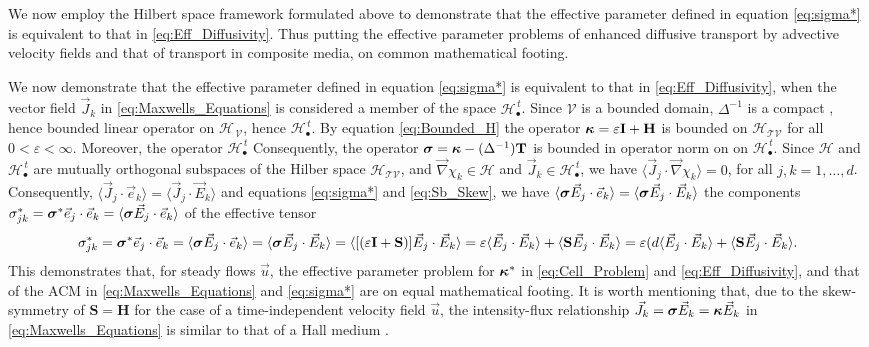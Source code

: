 \documentclass[11pt]{amsart}
\newcommand{\Tb}{\mathbf{T}}
\newcommand{\Hb}{\mathbf{H}}
\newcommand{\Ib}{\mathbf{I}}
\newcommand{\Sb}{\mathbf{S}}
\newcommand{\Tc}{\mathcal{T}}
\newcommand{\Vc}{\mathcal{V}}
\newcommand{\Hs}{\mathscr{H}}
\newcommand\bsig{\mbox{\boldmath${\sigma}$}}
\newcommand\bkappa{\mbox{\boldmath${\kappa}$}}
\begin{document}
We now employ the Hilbert space framework formulated above to
demonstrate that the effective parameter defined in equation
\eqref{eq:sigma*} is equivalent to that in
\eqref{eq:Eff_Diffusivity}. Thus putting the effective parameter
problems of enhanced diffusive transport by advective velocity fields
and that of transport in composite media, on common mathematical
footing.




We now demonstrate that the effective parameter defined in equation
\eqref{eq:sigma*} is equivalent to that in \eqref{eq:Eff_Diffusivity},
when the vector field $\vec{J}_k$ in \eqref{eq:Maxwells_Equations} is
considered a member of the space $\Hs_\bullet^{\,t}$.
Since $\Vc$ is a bounded domain, $\Delta^{-1}$ is
a compact \cite{Stakgold:BVP:2000}, hence bounded linear 
operator on $\Hs_{\,\Vc}$, hence $\Hs_\bullet^{\,t}$. By equation
\eqref{eq:Bounded_H} the operator $\bkappa=\varepsilon\Ib+\Hb$ is bounded on
$\Hs_{\Tc\Vc}$ for all $0<\varepsilon<\infty$. Moreover, the operator  $\Hs_\bullet^{\,t}$
Consequently, the operator $\bsig=\bkappa-(\Delta^{-1})\Tb$ is 
bounded in operator norm on on 
$\Hs_\bullet^{\,t}$. Since $\mathscr{H}$ and $\Hs_\bullet^{\,t}$ are mutually
orthogonal subspaces of the Hilber space $\Hs_{\Tc\Vc}$, and
$\vec{\nabla}\chi_k\in\mathscr{H}$ and $\vec{J}_k\in\Hs_\bullet^{\,t}$, we have
$\langle\vec{J}_j\cdot\vec{\nabla}\chi_k\rangle=0$, for all $j,k=1,\ldots,d$. Consequently,
$\langle\vec{J}_j\cdot\vec{e}_k\rangle=\langle\vec{J}_j\cdot\vec{E}_k\rangle$ and 
equations 
\eqref{eq:sigma*} and \eqref{eq:Sb_Skew}, we have
$\langle\bsig\vec{E}_j\cdot\vec{e}_k\rangle=\langle\bsig\vec{E}_j\cdot\vec{E}_k\rangle$ the components  
$\sigma^*_{jk}=\bsig^*\vec{e}_j\cdot\vec{e}_k=\langle\bsig\vec{E}_j\cdot\vec{e}_k\rangle$ of
the effective tensor 
%
\begin{align}\label{eq:Reduction}
  \sigma^*_{jk}=\bsig^*\vec{e}_j\cdot\vec{e}_k 
       =\langle\bsig\vec{E}_j\cdot\vec{e}_k\rangle
       =\langle\bsig\vec{E}_j\cdot\vec{E}_k\rangle
       =\langle[(\varepsilon\Ib+\Sb)]\vec{E}_j\cdot\vec{E}_k\rangle
       =\varepsilon\langle\vec{E}_j\cdot\vec{E}_k\rangle+\langle\Sb\vec{E}_j\cdot\vec{E}_k\rangle
       =\varepsilon(d\langle\vec{E}_j\cdot\vec{E}_k\rangle+\langle\Sb\vec{E}_j\cdot\vec{E}_k\rangle.
\end{align}
%
This demonstrates that, for steady flows $\vec{u}$, the effective
parameter problem for $\bkappa^*$ in \eqref{eq:Cell_Problem} and
\eqref{eq:Eff_Diffusivity}, and that of the ACM \cite{Golden:CMP-473}
in \eqref{eq:Maxwells_Equations} and \eqref{eq:sigma*}  are on equal
mathematical footing. It is worth  
mentioning that, due to the skew-symmetry of $\Sb=\Hb$ for the case of
a time-independent velocity field $\vec{u}$, the intensity-flux
relationship $\vec{J}_k=\bsig\vec{E}_k=\bkappa\vec{E}_k$ in
\eqref{eq:Maxwells_Equations} is similar to that of a Hall medium
\cite{Isichenko:JNS:1991:375}.    
\end{document}
